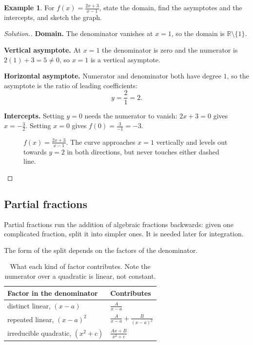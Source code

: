 \documentclass[11pt,a4paper]{article}
\theoremstyle{definition}
\newtheorem{example}[thm]{Example}
\newenvironment{solution}
  {\renewcommand{\qedsymbol}{}\begin{proof}[\textit{Solution}.]}
  {\end{proof}}
\begin{document}
\begin{example}
For $f(x)=\frac{2x+3}{x-1}$, state the domain, find the asymptotes and the
intercepts, and sketch the graph.
\end{example}

\begin{solution}
\textbf{Domain.} The denominator vanishes at $x=1$, so the domain is
$\mathbb{R}\setminus\{1\}$.

\textbf{Vertical asymptote.} At $x=1$ the denominator is zero and the numerator is
$2(1)+3=5\neq 0$, so $x=1$ is a vertical asymptote.

\textbf{Horizontal asymptote.} Numerator and denominator both have degree $1$, so the
asymptote is the ratio of leading coefficients:
$$y=\frac{2}{1}=2.$$

\textbf{Intercepts.} Setting $y=0$ needs the numerator to vanish:
$2x+3=0$ gives $x=-\frac{3}{2}$. Setting $x=0$ gives
$f(0)=\frac{3}{-1}=-3$.

\begin{figure}[H]
\centering
{}
\caption{$f(x)=\frac{2x+3}{x-1}$. The curve approaches $x=1$ vertically and levels out towards $y=2$ in both directions, but never touches either dashed line.}
\end{figure}
\end{solution}

\subsection{Partial fractions}

Partial fractions run the addition of algebraic fractions backwards: given one
complicated fraction, split it into simpler ones. It is needed later for integration.

The form of the split depends on the factors of the denominator.

\begin{table}[H]
\centering
\begin{tabular}{|l|l|}
\hline
Factor in the denominator & Contributes\\
\hline
distinct linear, $(x-a)$ & $\frac{A}{x-a}$\\[4pt]
repeated linear, $(x-a)^2$ & $\frac{A}{x-a}+\frac{B}{(x-a)^2}$\\[4pt]
irreducible quadratic, $(x^2+c)$ & $\frac{Ax+B}{x^2+c}$\\
\hline
\end{tabular}
\caption{What each kind of factor contributes. Note the numerator over a quadratic is linear, not constant.}
\end{table}
\end{document}

